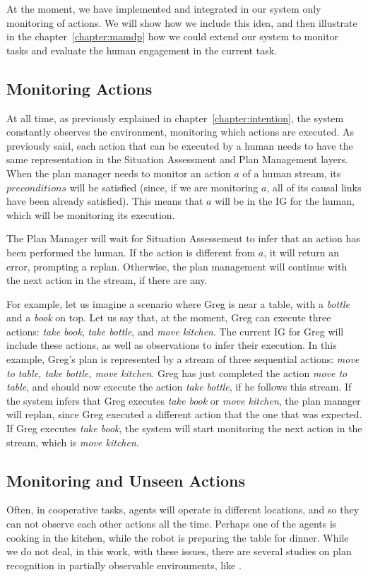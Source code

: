 At the moment, we have implemented and integrated in our system only monitoring of actions. We will show how we include this idea, and then illustrate in the chapter~\ref{chapter:mamdp} how we could extend our system to monitor tasks and evaluate the human engagement in the current task.

\subsection{Monitoring Actions}
At all time, as previously explained in chapter~\ref{chapter:intention}, the system constantly observes the environment, monitoring which actions are executed. As previously said, each action that can be executed by a human needs to have the same representation in the Situation Assessment and Plan Management layers. When the plan manager needs to monitor an action $a$ of a human stream, its $preconditions$ will be satisfied (since, if we are monitoring $a$, all of its causal links have been already satisfied). This means that $a$ will be in the IG for the human, which will be monitoring its execution.

The Plan Manager will wait for Situation Assessement to infer that an action has been performed the human. If the action is different from $a$, it will return an error, prompting a replan. Otherwise, the plan management will continue with the next action in the stream, if there are any.

For example, let us imagine a scenario where Greg is near a table, with a \textit{bottle} and a \textit{book} on top. Let us say that, at the moment, Greg can execute three actions: \textit{take book}, \textit{take bottle}, and \textit{move kitchen}. The current IG for Greg will include these actions, as well as observations to infer their execution. In this example, Greg's plan is represented by a stream of three sequential actions: \textit{move to table, take bottle, move kitchen}. 
Greg has just completed the action \textit{move to table}, and should now execute the action \textit{take bottle}, if he follows this stream. If the system infers that Greg executes \textit{take book} or \textit{move kitchen}, the plan manager will replan, since Greg executed a different action that the one that was expected. If Greg executes \textit{take book}, the system will start monitoring the next action in the stream, which is \textit{move kitchen}.


\subsection{Monitoring and Unseen Actions}
Often, in cooperative tasks, agents will operate in different locations, and so they can not observe each other actions all the time. Perhaps one of the agents is cooking in the kitchen,  while the robot is preparing the table for dinner. While we do not deal, in this work, with these issues, there are several studies on plan recognition in partially observable environments, like \cite{geib2005partial}.